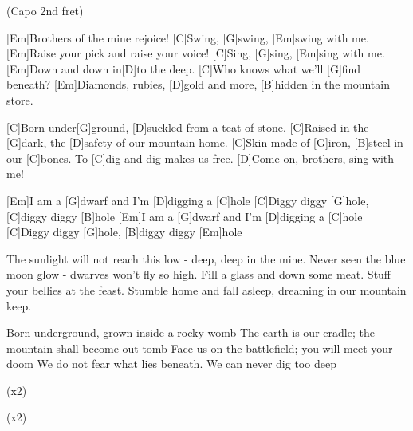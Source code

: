 
{\footnotesize(Capo 2nd fret)}

\begin{guitar}
	[Em]Brothers of the mine rejoice! [C]Swing, [G]swing, [Em]swing with me.
	[Em]Raise your pick and raise your voice! [C]Sing, [G]sing, [Em]sing with me.
	[Em]Down and down in[D]to the deep. [C]Who knows what we'll [G]find beneath?
	[Em]Diamonds, rubies, [D]gold and more, [B]hidden in the mountain store.
	
	[C]Born under[G]ground, [D]suckled from a teat of stone.
	[C]Raised in the [G]dark, the [D]safety of our mountain home.
	[C]Skin made of [G]iron, [B]steel in our [C]bones.
	To [C]dig and dig makes us free. [D]Come on, brothers, sing with me!
	
	[Em]I am a [G]dwarf and I'm [D]digging a [C]hole
	[C]Diggy diggy [G]hole, [C]diggy diggy [B]hole
	[Em]I am a [G]dwarf and I'm [D]digging a [C]hole
	[C]Diggy diggy [G]hole, [B]diggy diggy [Em]hole
	
	The sunlight will not reach this low - deep, deep in the mine.
	Never seen the blue moon glow - dwarves won't fly so high.
	Fill a glass and down some meat. Stuff your bellies at the feast.
	Stumble home and fall asleep, dreaming in our mountain keep.
	
	Born underground, grown inside a rocky womb
	The earth is our cradle; the mountain shall become out tomb
	Face us on the battlefield; you will meet your doom
	We do not fear what lies beneath. We can never dig too deep
	
	  (x2)
	
	 
	
	  (x2)
\end{guitar}